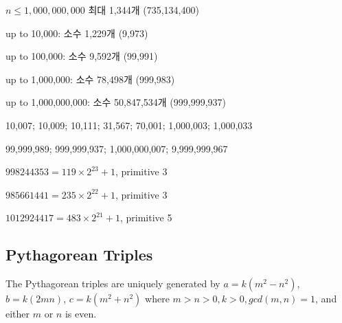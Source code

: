 $n \leq 1,000,000,000$ 최대 1,344개 (735,134,400)

up to 10,000: 소수 1,229개 (9,973)

up to 100,000: 소수 9,592개 (99,991)

up to 1,000,000: 소수 78,498개 (999,983)

up to 1,000,000,000: 소수 50,847,534개 (999,999,937)

10,007; 10,009; 10,111; 31,567; 70,001; 1,000,003; 1,000,033

99,999,989; 999,999,937; 1,000,000,007; 9,999,999,967

$998244353 = 119 \times 2^{23} + 1$, primitive 3

$985661441 = 235 \times 2^{22} + 1$, primitive 3

$1012924417 = 483 \times 2^{21} + 1$, primitive 5

\subsection{Pythagorean Triples}
The Pythagorean triples are uniquely generated by $a=k(m^2-n^2)$, $b=k(2mn)$, $c=k(m^2+n^2)$ where $m>n>0, k>0, gcd(m,n)=1$, and either $m$ or $n$ is even.